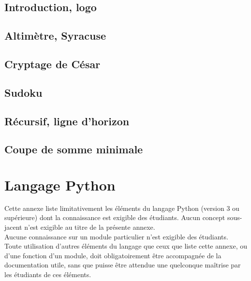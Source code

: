 \documentclass[book]{magnolia}
\begin{document}
\chapter{Introduction, logo}


\chapter{Altimètre, Syracuse}


\chapter{Cryptage de César}


% 

\chapter{Sudoku}


\chapter{Récursif, ligne d'horizon}


\chapter{Coupe de somme minimale}


\part{Langage Python}
Cette annexe liste limitativement les éléments du langage Python (version 3 ou supérieure) dont la connaissance est exigible des étudiants. Aucun concept sous-jacent n'est exigible au titre de la présente annexe.\\

Aucune connaissance sur un module particulier n'est exigible des étudiants.\\

Toute utilisation d'autres éléments du langage que ceux que liste cette annexe, ou d'une fonction d'un module, doit obligatoirement être accompagnée de la documentation utile, sans que puisse être attendue une quelconque maîtrise par les étudiants de ces éléments.
\end{document}
